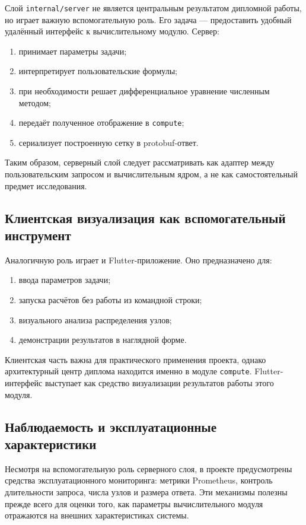 Слой \texttt{internal/server} не является центральным результатом дипломной работы, но играет важную вспомогательную роль. Его задача --- предоставить удобный удалённый интерфейс к вычислительному модулю. Сервер:
\begin{enumerate}
    \item принимает параметры задачи;
    \item интерпретирует пользовательские формулы;
    \item при необходимости решает дифференциальное уравнение численным методом;
    \item передаёт полученное отображение в \texttt{compute};
    \item сериализует построенную сетку в protobuf-ответ.
\end{enumerate}

Таким образом, серверный слой следует рассматривать как адаптер между пользовательским запросом и вычислительным ядром, а не как самостоятельный предмет исследования.

\subsection{Клиентская визуализация как вспомогательный инструмент}

Аналогичную роль играет и Flutter-приложение. Оно предназначено для:
\begin{enumerate}
    \item ввода параметров задачи;
    \item запуска расчётов без работы из командной строки;
    \item визуального анализа распределения узлов;
    \item демонстрации результатов в наглядной форме.
\end{enumerate}

Клиентская часть важна для практического применения проекта, однако архитектурный центр диплома находится именно в модуле \texttt{compute}. Flutter-интерфейс выступает как средство визуализации результатов работы этого модуля.

\subsection{Наблюдаемость и эксплуатационные характеристики}

Несмотря на вспомогательную роль серверного слоя, в проекте предусмотрены средства эксплуатационного мониторинга: метрики Prometheus, контроль длительности запроса, числа узлов и размера ответа. Эти механизмы полезны прежде всего для оценки того, как параметры вычислительного модуля отражаются на внешних характеристиках системы.

